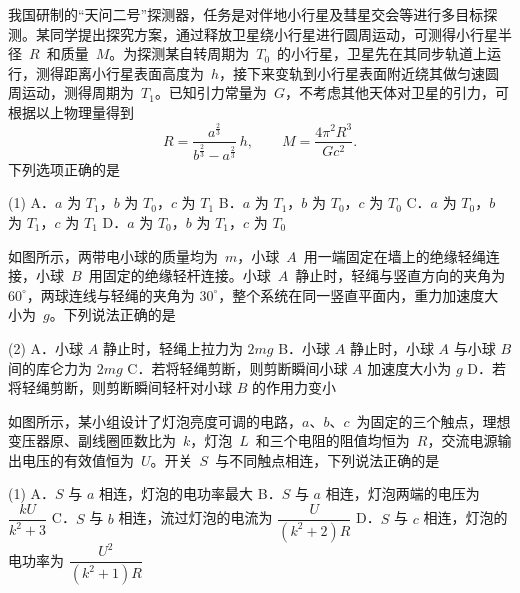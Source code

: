 \begin{question}
我国研制的“天问二号”探测器，任务是对伴地小行星及彗星交会等进行多目标探测。某同学提出探究方案，通过释放卫星绕小行星进行圆周运动，可测得小行星半径~$R$~和质量~$M$。为探测某自转周期为~$T_{0}$~的小行星，卫星先在其同步轨道上运行，测得距离小行星表面高度为~$h$，接下来变轨到小行星表面附近绕其做匀速圆周运动，测得周期为~$T_{1}$。已知引力常量为~$G$，不考虑其他天体对卫星的引力，可根据以上物理量得到
\[
  R=\frac{a^{\frac{2}{3}}}{b^{\frac{2}{3}}-a^{\frac{2}{3}}}\,h,\qquad
  M=\frac{4\pi^{2}R^{3}}{Gc^{2}}.
\]
下列选项正确的是\gkblank


\begin{gkopts}(1)
  \task A．$a$ 为 $T_{1}$，$b$ 为 $T_{0}$，$c$ 为 $T_{1}$
  \task B．$a$ 为 $T_{1}$，$b$ 为 $T_{0}$，$c$ 为 $T_{0}$
  \task C．$a$ 为 $T_{0}$，$b$ 为 $T_{1}$，$c$ 为 $T_{1}$
  \task D．$a$ 为 $T_{0}$，$b$ 为 $T_{1}$，$c$ 为 $T_{0}$
\end{gkopts}
\end{question}

\begin{question}
如图所示，两带电小球的质量均为~$m$，小球~$A$~用一端固定在墙上的绝缘轻绳连接，小球~$B$~用固定的绝缘轻杆连接。小球~$A$~静止时，轻绳与竖直方向的夹角为 $60^{\circ}$，两球连线与轻绳的夹角为 $30^{\circ}$，整个系统在同一竖直平面内，重力加速度大小为~$g$。下列说法正确的是\gkblank


\begin{gkopts}(2)
  \task A．小球 $A$ 静止时，轻绳上拉力为 $2mg$
  \task B．小球 $A$ 静止时，小球 $A$ 与小球 $B$ 间的库仑力为 $2mg$
  \task C．若将轻绳剪断，则剪断瞬间小球 $A$ 加速度大小为 $g$
  \task D．若将轻绳剪断，则剪断瞬间轻杆对小球 $B$ 的作用力变小
\end{gkopts}
\end{question}

\begin{question}
如图所示，某小组设计了灯泡亮度可调的电路，$a$、$b$、$c$~为固定的三个触点，理想变压器原、副线圈匝数比为~$k$，灯泡~$L$~和三个电阻的阻值均恒为~$R$，交流电源输出电压的有效值恒为~$U$。开关~$S$~与不同触点相连，下列说法正确的是\gkblank


\begin{gkopts}(1)
  \task A．$S$ 与 $a$ 相连，灯泡的电功率最大
  \task B．$S$ 与 $a$ 相连，灯泡两端的电压为 $\dfrac{kU}{k^{2}+3}$
  \task C．$S$ 与 $b$ 相连，流过灯泡的电流为 $\dfrac{U}{(k^{2}+2)R}$
  \task D．$S$ 与 $c$ 相连，灯泡的电功率为 $\dfrac{U^{2}}{(k^{2}+1)R}$
\end{gkopts}
\end{question}

